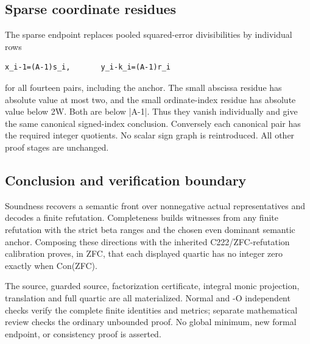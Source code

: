 \subsection{Sparse coordinate residues}



The sparse endpoint replaces pooled squared-error divisibilities by individual rows



\begin{verbatim}
x_i-1=(A-1)s_i,       y_i-k_i=(A-1)r_i
\end{verbatim}

for all fourteen pairs, including the anchor. The small abscissa residue has absolute value at most two, and the small ordinate-index residue has absolute value below 2W. Both are below |A-1|. Thus they vanish individually and give the same canonical signed-index conclusion. Conversely each canonical pair has the required integer quotients. No scalar sign graph is reintroduced. All other proof stages are unchanged.



\subsection{Conclusion and verification boundary}



Soundness recovers a semantic front over nonnegative actual representatives and decodes a finite refutation. Completeness builds witnesses from any finite refutation with the strict beta ranges and the chosen even dominant semantic anchor. Composing these directions with the inherited C222/\allowbreak{}ZFC-refutation calibration proves, in ZFC, that each displayed quartic has no integer zero exactly when Con(ZFC).



The source, guarded source, factorization certificate, integral monic projection, translation and full quartic are all materialized. Normal and -O independent checks verify the complete finite identities and metrics; separate mathematical review checks the ordinary unbounded proof. No global minimum, new formal endpoint, or consistency proof is asserted.
